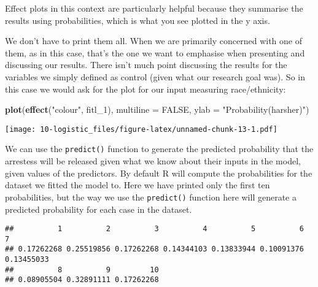 \documentclass[
]{book}
\newenvironment{Shaded}{\begin{snugshade}}{\end{snugshade}}
\newcommand{\AttributeTok}[1]{\textcolor[rgb]{0.13,0.29,0.53}{#1}}
\newcommand{\CommentTok}[1]{\textcolor[rgb]{0.56,0.35,0.01}{\textit{#1}}}
\newcommand{\ConstantTok}[1]{\textcolor[rgb]{0.56,0.35,0.01}{#1}}
\newcommand{\DecValTok}[1]{\textcolor[rgb]{0.00,0.00,0.81}{#1}}
\newcommand{\FunctionTok}[1]{\textcolor[rgb]{0.13,0.29,0.53}{\textbf{#1}}}
\newcommand{\NormalTok}[1]{#1}
\newcommand{\OtherTok}[1]{\textcolor[rgb]{0.56,0.35,0.01}{#1}}
\newcommand{\SpecialCharTok}[1]{\textcolor[rgb]{0.81,0.36,0.00}{\textbf{#1}}}
\newcommand{\StringTok}[1]{\textcolor[rgb]{0.31,0.60,0.02}{#1}}
\begin{document}
Effect plots in this context are particularly helpful because they summarise the results using probabilities, which is what you see plotted in the y axis.

We don't have to print them all. When we are primarily concerned with one of them, as in this case, that's the one we want to emphasise when presenting and discussing our results. There isn't much point discussing the results for the variables we simply defined as control (given what our research goal was). So in this case we would ask for the plot for our input measuring race/ethnicity:

\begin{Shaded}
\begin{Highlighting}[]
\FunctionTok{plot}\NormalTok{(}\FunctionTok{effect}\NormalTok{(}\StringTok{"colour"}\NormalTok{, fitl\_1), }\AttributeTok{multiline =} \ConstantTok{FALSE}\NormalTok{, }\AttributeTok{ylab =} \StringTok{"Probability(harsher)"}\NormalTok{)}
\end{Highlighting}
\end{Shaded}

\texttt{[image: 10-logistic\_files/figure-latex/unnamed-chunk-13-1.pdf]}

We can use the \texttt{predict()} function to generate the predicted probability that the arrestess will be released given what we know about their inputs in the model, given values of the predictors. By default R will compute the probabilities for the dataset we fitted the model to. Here we have printed only the first ten probabilities, but the way we use the \texttt{predict()} function here will generate a predicted probability for each case in the dataset.

\begin{Shaded}
\end{Shaded}

\begin{verbatim}
##          1          2          3          4          5          6          7 
## 0.17262268 0.25519856 0.17262268 0.14344103 0.13833944 0.10091376 0.13455033 
##          8          9         10 
## 0.08905504 0.32891111 0.17262268
\end{verbatim}
\end{document}
